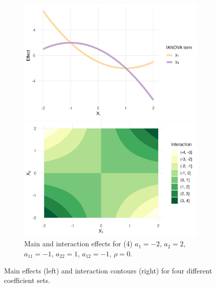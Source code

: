 \begin{figure}[htpb]
    \begin{subfigure}[t]{\textwidth}
        \centering
        \begin{minipage}[t]{0.49\textwidth}
            \includegraphics[width=\textwidth]{images/experiment_section/full_a1m20_a2m20_a11p10_a22m10_a12p10_rhop00_main.png}
        \end{minipage}%
        \hfill
        \begin{minipage}[t]{0.49\textwidth}
            \includegraphics[width=\textwidth]{images/experiment_section/full_a1m20_a2m20_a11p10_a22m10_a12p10_rhop00_interaction.png}
        \end{minipage}
        \caption{Main and interaction effects for (4) $a_1 = -2$, $a_2 = 2$, 
                 $a_{11} = -1$, $a_{22} = 1$, $a_{12} = -1$, $\rho = 0$.}
    \end{subfigure}

    \caption{Main effects (left) and interaction contours (right) for four different \\ coefficient sets.}
    \label{fig:all_pair_02}
\end{figure}

